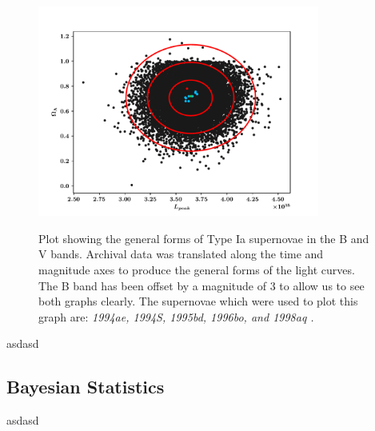 \documentclass[twocolumn]{revtex4}
\begin{document}
{\begin{figure}[!h]
\begin{center}
\includegraphics[width=9.25cm]{results/ol_lp_complete}
\caption[]{Plot showing the general forms of Type Ia supernovae in the B and V bands. Archival data was translated along the time and magnitude axes to produce the general forms of the light curves. The B band has been offset by a magnitude of $3$ to allow us to see both graphs clearly. The supernovae which were used to plot this graph are: \em{1994ae, 1994S, 1995bd, 1996bo, }\em  and \em{1998aq }\em \cite{jha, matheson}. }
\vspace{-3ex}
\label{fig:ol_lp_complete}
\end{center}
\end{figure}

asdasd

\vspace{-3ex}
\subsection{Bayesian Statistics} 
\vspace{-2ex}

asdasd


}
\end{document}
